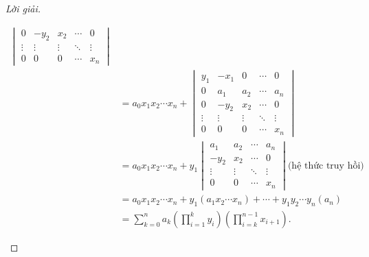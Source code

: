 \documentclass[class=linear-algebra,crop=false]{standalone}
\begin{document}
\begin{proof}[Lời giải]
\begin{enumerate}[label = (\alph*)]
\begin{align*}
\begin{vmatrix}
				      0      & -y_{2} & x_{2}  & \cdots & 0      \\
				      \vdots & \vdots & \vdots & \ddots & \vdots \\
				      0      & 0      & 0      & \cdots & x_{n}
			      \end{vmatrix}                                                         \\
			       & =
			      a_{0}x_{1}x_{2}\cdots x_{n}
			      +
			      \begin{vmatrix}
				      y_{1}  & -x_{1} & 0      & \cdots & 0      \\
				      0      & a_{1}  & a_{2}  & \cdots & a_{n}  \\
				      0      & -y_{2} & x_{2}  & \cdots & 0      \\
				      \vdots & \vdots & \vdots & \ddots & \vdots \\
				      0      & 0      & 0      & \cdots & x_{n}
			      \end{vmatrix}                                                         \\
			       & =
			      a_{0}x_{1}x_{2}\cdots x_{n}
			      +
			      y_{1}
			      \begin{vmatrix}
				      a_{1}  & a_{2}  & \cdots & a_{n}  \\
				      -y_{2} & x_{2}  & \cdots & 0      \\
				      \vdots & \vdots & \ddots & \vdots \\
				      0      & 0      & \cdots & x_{n}
			      \end{vmatrix} \text{(hệ thức truy hồi)}                                                            \\
			       & = a_{0}x_{1}x_{2}\cdots x_{n}
			      + y_{1} (a_{1}x_{2}\cdots x_{n})
			      + \cdots
			      + y_{1}y_{2}\cdots y_{n} (a_{n})                                                                   \\
			       & = \sum^{n}_{k=0} a_{k}\left(\prod^{k}_{i=1}y_{i}\right)\left(\prod^{n-1}_{i=k}x_{i + 1}\right).
		      \end{align*}
	\end{enumerate}
\end{proof}
\end{document}
